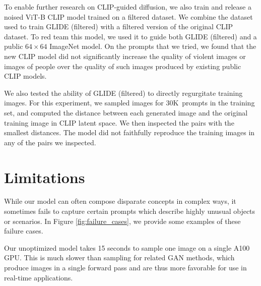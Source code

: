 To enable further research on CLIP-guided diffusion, we also train and release a noised ViT-B CLIP model trained on a filtered dataset. We combine the dataset used to train GLIDE (filtered) with a filtered version of the original CLIP dataset. To red team this model, we used it to guide both GLIDE (filtered) and a public $64 \times 64$ ImageNet model. On the prompts that we tried, we found that the new CLIP model did not significantly increase the quality of violent images or images of people over the quality of such images produced by existing public CLIP models.

We also tested the ability of GLIDE (filtered) to directly regurgitate training images. For this experiment, we sampled images for 30K~prompts in the training set, and computed the distance between each generated image and the original training image in CLIP latent space. We then inspected the pairs with the smallest distances. The model did not faithfully reproduce the training images in any of the pairs we inspected.

\section{Limitations}
\label{sec:limitations}

While our model can often compose disparate concepts in complex ways, it sometimes fails to capture certain prompts which describe highly unusual objects or scenarios. In Figure \ref{fig:failure_cases}, we provide some examples of these failure cases.

Our unoptimized model takes 15 seconds to sample one image on a single A100 GPU. This is much slower than sampling for related GAN methods, which produce images in a single forward pass and are thus more favorable for use in real-time applications.



